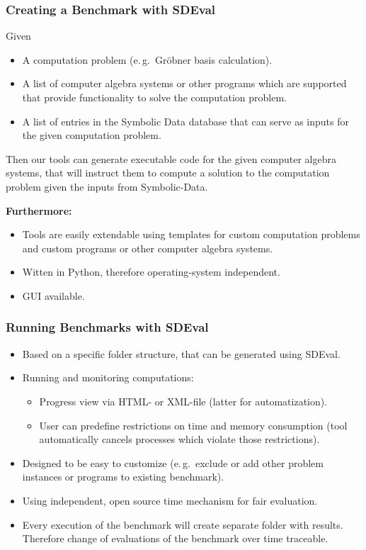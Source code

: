 \documentclass{beamer}
\begin{document}
\begin{frame}
  \frametitle{Creating a Benchmark with SDEval}
  
  Given
  \begin{itemize}
    \item A computation problem (e.\,g.\ Gr{\"o}bner basis calculation).
    \item A list of computer algebra systems or other programs which are
      supported that provide functionality to solve the computation problem.
    \item A list of entries in the Symbolic Data database that can serve as
      inputs for the given computation problem.
  \end{itemize}
  Then our tools can generate executable code for the given computer algebra
  systems, that will instruct them to compute a solution to the computation
  problem given the inputs from Symbolic-Data.
  
  {\textbf{Furthermore:}}
  \begin{itemize}
    \item Tools are easily extendable using templates for custom computation
      problems and custom programs or other computer algebra systems.
    \item Witten in Python, therefore operating-system independent.
    \item GUI available.
  \end{itemize}
\end{frame}
\begin{frame}
  \frametitle{Running Benchmarks with SDEval}
 
  \begin{itemize}
    \item Based on a specific folder structure, that can be generated using
      SDEval.
    \item Running and monitoring computations:
    \begin{itemize}
      \item Progress view via HTML- or XML-file (latter for automatization).
      \item User can predefine restrictions on time and memory consumption
        (tool automatically cancels processes which violate those
        restrictions).
    \end{itemize}
    \item Designed to be easy to customize (e.\,g.\ exclude or add other
      problem instances or programs to existing benchmark).
    \item Using independent, open source time mechanism for fair evaluation.
    \item Every execution of the benchmark will create separate folder with
      results. Therefore change of evaluations of the benchmark over time
      traceable.
  \end{itemize}
\end{frame}
\end{document}
